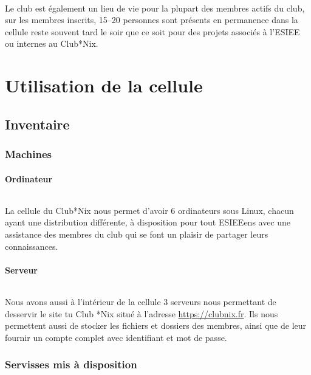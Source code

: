 \documentclass[11pt]{report}
\begin{document}
\paragraph{} Le club est également un lieu de vie pour la plupart des membres
actifs du club, sur les membres inscrits, 15--20 personnes sont
présents en permanence dans la cellule reste souvent tard le soir que ce soit pour des projets 
associés à l'ESIEE ou internes au Club*Nix.

\part{Utilisation de la cellule}

\chapter{Inventaire}

\section{Machines}
\subsection{Ordinateur}
\paragraph{} La cellule du Club*Nix nous permet d'avoir 6 ordinateurs sous
Linux, chacun ayant une distribution différente, à disposition pour tout
ESIEEens avec une assistance des membres du club qui se font un plaisir de
partager leurs connaissances.
\subsection{Serveur}
\paragraph{} Nous avons aussi à l'intérieur de la cellule 3 serveurs nous
permettant de desservir le site tu Club *Nix situé à l'adresse
\url{https://clubnix.fr}. Ils nous permettent aussi de stocker les fichiers et
dossiers des membres, ainsi que de leur fournir un compte complet avec
identifiant et mot de passe.



\section{Servisses mis à disposition}
\end{document}
